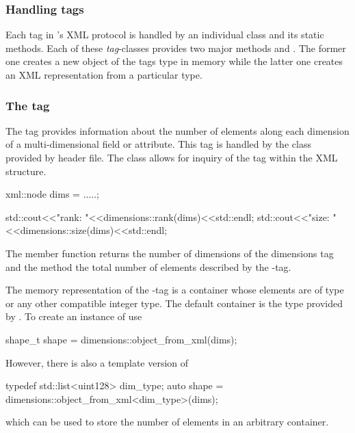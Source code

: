 \subsubsection{Handling tags}

Each tag in \libpniio's XML protocol is handled by an individual class and its
static methods. Each of these \emph{tag}-classes provides two major methods 
 and . The former one creates a new
object of the tags type in memory while the latter one creates an XML
representation from a particular type.

\subsubsection{The  tag}

The  tag provides information about the number of elements 
along each dimension of a multi-dimensional field or attribute. This tag is
handled by the  class provided by 
header file. 
The  class allows for inquiry of the  tag 
within the XML structure. 
\begin{cppcode}
xml::node dims = .....;

std::cout<<"rank: "<<dimensions::rank(dims)<<std::endl;
std::cout<<"size: "<<dimensions::size(dims)<<std::endl;
\end{cppcode}
The  member function returns the number of dimensions of the 
dimensions tag and the  method the total number of elements 
described by the -tag.

The memory representation of the -tag is a container 
whose elements are of type  or any other compatible integer type. 
The default container is the  type provided by \libpnicore. 
To create an instance of  use
\begin{cppcode}
shape_t shape = dimensions::object_from_xml(dims);
\end{cppcode}
However, there is also a template version of  
\begin{cppcode}
typedef std::list<uint128> dim_type;
auto shape = dimensions::object_from_xml<dim_type>(dims);
\end{cppcode}
which can be used to store the number of elements in an arbitrary container.

